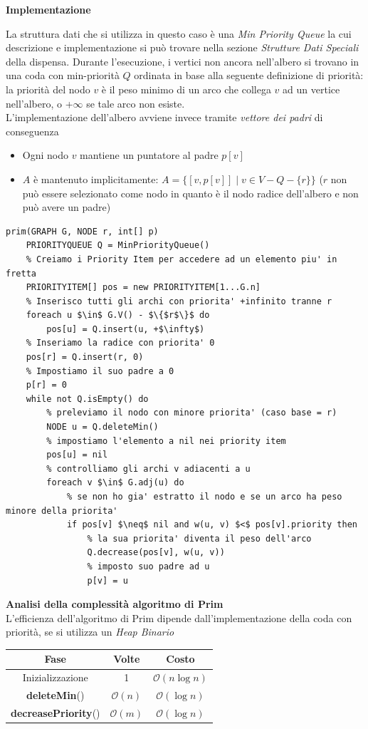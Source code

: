 \documentclass[../cheatSheetAlgoritmi.tex]{subfiles}
\begin{document}
\bigskip

\textbf{Implementazione}

La struttura dati che si utilizza in questo caso è una \emph{Min Priority Queue} la cui descrizione e implementazione si può trovare nella sezione \emph{Strutture Dati Speciali} della dispensa. Durante l'esecuzione, i vertici non ancora nell'albero si trovano in una coda con min-priorità $Q$ ordinata in base alla seguente definizione di priorità: la priorità del nodo $v$ è il peso minimo di un arco che collega $v$ ad un vertice nell'albero, o +$\infty$ se tale arco non esiste.\\
L'implementazione dell'albero avviene invece tramite \emph{vettore dei padri} di conseguenza
\begin{itemize}
	\item Ogni nodo $v$ mantiene un puntatore al padre $p[v]$
	\item $A$ è mantenuto implicitamente: $A = \{[v, p[v]] \mid v \in V - Q - \{r\}\}$ ($r$ non può essere selezionato come nodo in quanto è il nodo radice dell'albero e non può avere un padre)
\end{itemize}
\begin{lstlisting}[caption=Albero di Copertura di Peso Minimo - Prim]
prim(GRAPH G, NODE r, int[] p)
	PRIORITYQUEUE Q = MinPriorityQueue()
	% Creiamo i Priority Item per accedere ad un elemento piu' in fretta
	PRIORITYITEM[] pos = new PRIORITYITEM[1...G.n]
	% Inserisco tutti gli archi con priorita' +infinito tranne r
	foreach u $\in$ G.V() - $\{$r$\}$ do
		pos[u] = Q.insert(u, +$\infty$)
	% Inseriamo la radice con priorita' 0
	pos[r] = Q.insert(r, 0)
	% Impostiamo il suo padre a 0
	p[r] = 0
	while not Q.isEmpty() do
		% preleviamo il nodo con minore priorita' (caso base = r)
		NODE u = Q.deleteMin()
		% impostiamo l'elemento a nil nei priority item
		pos[u] = nil
		% controlliamo gli archi v adiacenti a u
		foreach v $\in$ G.adj(u) do
			% se non ho gia' estratto il nodo e se un arco ha peso minore della priorita' 
			if pos[v] $\neq$ nil and w(u, v) $<$ pos[v].priority then
				% la sua priorita' diventa il peso dell'arco
				Q.decrease(pos[v], w(u, v))
				% imposto suo padre ad u
				p[v] = u
\end{lstlisting}
\textbf{Analisi della complessità algoritmo di Prim}\\
L'efficienza dell'algoritmo di Prim dipende dall'implementazione della coda con priorità, se si utilizza un \emph{Heap Binario}
\begin{center}
	\renewcommand{\arraystretch}{1.2}
	\begin{tabular}{ |c|c|c| } 
		\hline
			\textbf{Fase} & \textbf{Volte} & \textbf{Costo}\\ 
		\hline
			Inizializzazione & 1 &  $\mathcal{O}(n \log n)$\\ 
		\hline
			\textbf{deleteMin}() & $\mathcal{O}(n)$ &  $\mathcal{O}(\log n)$ \\
		\hline
			\textbf{decreasePriority}() & $\mathcal{O}(m)$ & $\mathcal{O}(\log n)$\\
		\hline
	\end{tabular}
\end{center}
\end{document}
